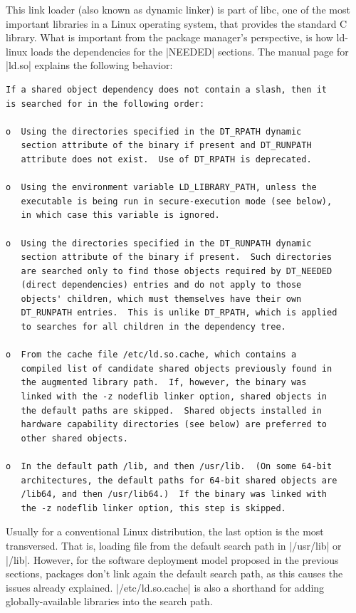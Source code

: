 This link loader (also known as dynamic linker) is part of
libc, one of the most important libraries in a Linux
operating system, that provides the standard C library. What
is important from the package manager's perspective, is how
ld-linux loads the dependencies for the |NEEDED| sections.
The manual page for |ld.so| \cite{LdLinuxManual} explains
the following behavior:

\begin{verbatim}
If a shared object dependency does not contain a slash, then it
is searched for in the following order:

o  Using the directories specified in the DT_RPATH dynamic
   section attribute of the binary if present and DT_RUNPATH
   attribute does not exist.  Use of DT_RPATH is deprecated.

o  Using the environment variable LD_LIBRARY_PATH, unless the
   executable is being run in secure-execution mode (see below),
   in which case this variable is ignored.

o  Using the directories specified in the DT_RUNPATH dynamic
   section attribute of the binary if present.  Such directories
   are searched only to find those objects required by DT_NEEDED
   (direct dependencies) entries and do not apply to those
   objects' children, which must themselves have their own
   DT_RUNPATH entries.  This is unlike DT_RPATH, which is applied
   to searches for all children in the dependency tree.

o  From the cache file /etc/ld.so.cache, which contains a
   compiled list of candidate shared objects previously found in
   the augmented library path.  If, however, the binary was
   linked with the -z nodeflib linker option, shared objects in
   the default paths are skipped.  Shared objects installed in
   hardware capability directories (see below) are preferred to
   other shared objects.

o  In the default path /lib, and then /usr/lib.  (On some 64-bit
   architectures, the default paths for 64-bit shared objects are
   /lib64, and then /usr/lib64.)  If the binary was linked with
   the -z nodeflib linker option, this step is skipped.
\end{verbatim}

Usually for a conventional Linux distribution, the last
option is the most transversed. That is, loading file from
the default search path in |/usr/lib| or |/lib|. However,
for the software deployment model proposed in the previous
sections, packages don't link again the default search path,
as this causes the issues already explained.
|/etc/ld.so.cache| is also a shorthand for adding
globally-available libraries into the search path.

